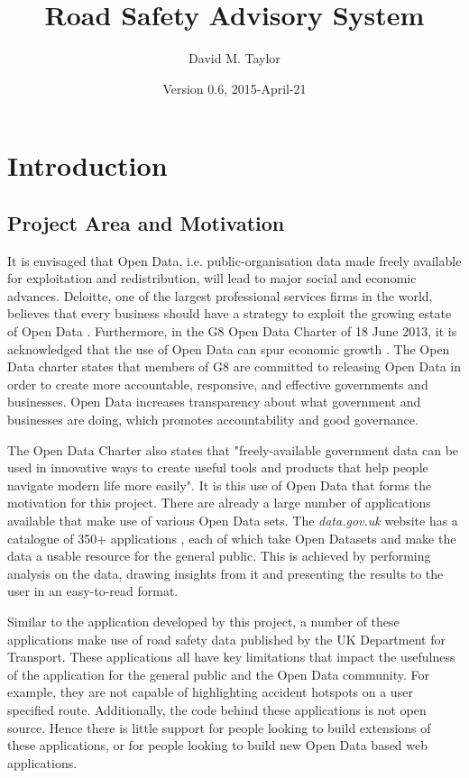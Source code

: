 \documentclass[authoryearcitations]{UoYCSproject}
\author{David M. Taylor}
\title{Road Safety Advisory System}
\date{Version 0.6, 2015-April-21}
\begin{document}
\maketitle
\listoffigures
\listoftables
\renewcommand*{\lstlistlistingname}{List of Listings}
\lstlistoflistings

\cleardoublepage
\label{sec:start}
\thispagestyle{empty}\cleardoublepage

\chapter{Introduction}

\section{Project Area and Motivation}

It is envisaged that Open Data, i.e. public-organisation data made freely available for exploitation and redistribution, will lead to major social and economic advances. Deloitte, one of the largest professional services firms in the world, believes that every business should have a strategy to exploit the growing estate of Open Data \citep{DeloitteAnalytics2012}. Furthermore, in the G8 Open Data Charter of 18 June 2013, it is acknowledged that the use of Open Data can spur economic growth \citep{CabinetOffice2013}. The Open Data charter states that members of G8 are committed to releasing Open Data in order to create more accountable, responsive, and effective governments and businesses. Open Data increases transparency about what government and businesses are doing, which promotes accountability and good governance.

The Open Data Charter also states that "freely-available government data can be used in innovative ways to create useful tools and products that help people navigate modern life more easily". It is this use of Open Data that forms the motivation for this project. There are already a large number of applications available that make use of various Open Data sets. The \textit{data.gov.uk} website has a catalogue of 350+ applications \citep{Data.go}, each of which take Open Datasets and make the data a usable resource for the general public. This is achieved by performing analysis on the data, drawing insights from it and presenting the results to the user in an easy-to-read format. 

Similar to the application developed by this project, a number of these applications make use of road safety data published by the UK Department for Transport. These applications all have key limitations that impact the usefulness of the application for the general public and the Open Data community. For example, they are not capable of highlighting accident hotspots on a user specified route. Additionally, the code behind these applications is not open source. Hence there is little support for people looking to build extensions of these applications, or for people looking to build new Open Data based web applications.
\end{document}
